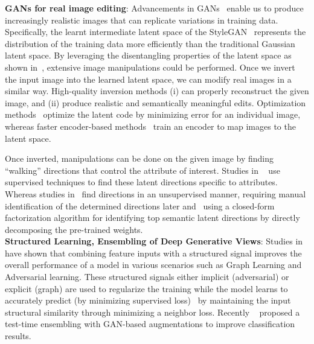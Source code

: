 \documentclass[runningheads]{llncs}
\begin{document}
\noindent \textbf{GANs for real image editing}: 
Advancements in GANs~\cite{gan,gan1,progan,bigan,stylegan,stylegan2,stylegan2-ada} enable us to produce increasingly realistic images that can replicate variations in training data. Specifically, the learnt intermediate latent space of the StyleGAN~\cite{stylegan,stylegan2,stylegan2-ada} represents the distribution of the training data more efficiently than the traditional Gaussian latent space. By leveraging the disentangling properties of the latent space as shown in~\cite{editing4,walking1,editing2,editing1,e4e,psp}, extensive image manipulations could be performed. Once we invert the input image into the learned latent space, we can modify real images in a similar way. High-quality inversion methods (i) can properly reconstruct the given image, and (ii) produce realistic and semantically meaningful edits. Optimization methods~\cite{invert3,invert2,invert1} optimize the latent code by minimizing error for an individual image, whereas faster encoder-based methods~\cite{invert4,invert5,e4e} train an encoder to map images to the latent space. 

Once inverted, manipulations can be done on the given image by finding “walking” directions that control the attribute of interest. Studies in ~\cite{walking1,ganalyze,walking_bias} use supervised techniques to find these latent directions specific to attributes. Whereas studies in~\cite{editing2,walking_un1,walking_un2} find directions in an unsupervised manner, requiring manual identification of the determined directions later and~\cite{sefa} using a closed-form factorization algorithm for identifying top semantic latent directions by directly decomposing the pre-trained weights. \\

\noindent \textbf{Structured Learning, Ensembling of Deep Generative Views}: 
Studies in~\cite{neural_graph_learning,ssl_gcn,goodfellow_adverarial,miyato} have shown that combining feature inputs with a structured signal improves the overall performance of a model in various scenarios such as Graph Learning and Adversarial learning. These structured signals either implicit (adversarial) or explicit (graph) are used to regularize the training while the model learns to accurately predict (by minimizing supervised loss)~\cite{nsl} by maintaining the input structural similarity through minimizing a neighbor loss. Recently ~\cite{ensembling_views} proposed a test-time ensembling with GAN-based augmentations to improve classification results. 
\end{document}
